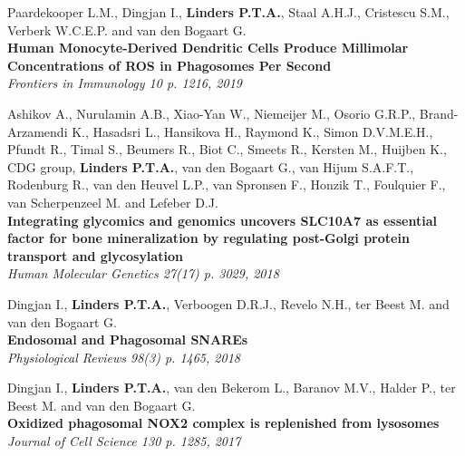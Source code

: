 \noindent Paardekooper L.M., Dingjan I., \textbf{Linders P.T.A.}, Staal A.H.J., Cristescu S.M., Verberk W.C.E.P. and van den Bogaart G. \\
\textbf{Human Monocyte-Derived Dendritic Cells Produce Millimolar Concentrations of ROS in Phagosomes Per Second} \\
\emph{Frontiers in Immunology 10 p. 1216, 2019}

\vspace{\baselineskip}

\noindent Ashikov A., Nurulamin A.B., Xiao-Yan W., Niemeijer M., Osorio G.R.P., Brand-Arzamendi K., Hasadsri L., Hansikova H., Raymond K., Simon D.V.M.E.H., Pfundt R., Timal S., Beumers R., Biot C., Smeets R., Kersten M., Huijben K., CDG group, \textbf{Linders P.T.A.}, van den Bogaart G., van Hijum S.A.F.T., Rodenburg R., van den Heuvel L.P., van Spronsen F., Honzik T., Foulquier F., van Scherpenzeel M. and Lefeber D.J. \\
\textbf{Integrating glycomics and genomics uncovers SLC10A7 as essential factor for bone mineralization by regulating post-Golgi protein transport and glycosylation} \\
\emph{Human Molecular Genetics 27(17) p. 3029, 2018}

\vspace{\baselineskip}

\noindent Dingjan I., \textbf{Linders P.T.A.}, Verboogen D.R.J., Revelo N.H., ter Beest M. and van den Bogaart G. \\
\textbf{Endosomal and Phagosomal SNAREs} \\
\emph{Physiological Reviews 98(3) p. 1465, 2018}

\vspace{\baselineskip}

\noindent Dingjan I.,  \textbf{Linders P.T.A.}, van den Bekerom L., Baranov M.V., Halder P., ter Beest M. and van den Bogaart G. \\
\textbf{Oxidized phagosomal NOX2 complex is replenished from lysosomes} \\
\emph{Journal of Cell Science 130 p. 1285, 2017}

